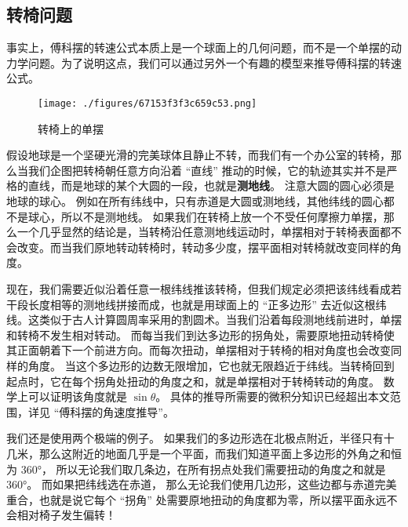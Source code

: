 \subsection{转椅问题}
事实上，傅科摆的转速公式本质上是一个球面上的几何问题，而不是一个单摆的动力学问题。为了说明这点，我们可以通过另外一个有趣的模型来推导傅科摆的转速公式。

\begin{figure}[ht]
\centering
\texttt{[image: ./figures/67153f3f3c659c53.png]}
\caption{转椅上的单摆} \label{fig_FouPen_2}
\end{figure}

假设地球是一个坚硬光滑的完美球体且静止不转，而我们有一个办公室的转椅，那么当我们企图把转椅朝任意方向沿着 “直线” 推动的时候，它的轨迹其实并不是严格的直线，而是地球的某个大圆的一段，也就是\textbf{测地线}。 注意大圆的圆心必须是地球的球心。 例如在所有纬线中，只有赤道是大圆或测地线，其他纬线的圆心都不是球心，所以不是测地线。 如果我们在转椅上放一个不受任何摩擦力单摆，那么一个几乎显然的结论是，当转椅沿任意测地线运动时，单摆相对于转椅表面都不会改变。而当我们原地转动转椅时，转动多少度，摆平面相对转椅就改变同样的角度。

现在，我们需要近似沿着任意一根纬线推该转椅，但我们规定必须把该纬线看成若干段长度相等的测地线拼接而成，也就是用球面上的 “正多边形” 去近似这根纬线。这类似于古人计算圆周率采用的割圆术。当我们沿着每段测地线前进时，单摆和转椅不发生相对转动。 而每当我们到达多边形的拐角处，需要原地扭动转椅使其正面朝着下一个前进方向。而每次扭动，单摆相对于转椅的相对角度也会改变同样的角度。 当这个多边形的边数无限增加，它也就无限趋近于纬线。当转椅回到起点时，它在每个拐角处扭动的角度之和，就是单摆相对于转椅转动的角度。 数学上可以证明该角度就是 $\sin\theta$。 具体的推导所需要的微积分知识已经超出本文范围，详见 “傅科摆的角速度推导”。

我们还是使用两个极端的例子。 如果我们的多边形选在北极点附近，半径只有十几米，那么这附近的地面几乎是一个平面，而我们知道平面上多边形的外角之和恒为 360°， 所以无论我们取几条边，在所有拐点处我们需要扭动的角度之和就是 360°。 而如果把纬线选在赤道， 那么无论我们使用几边形，这些边都与赤道完美重合，也就是说它每个 “拐角” 处需要原地扭动的角度都为零，所以摆平面永远不会相对椅子发生偏转！
